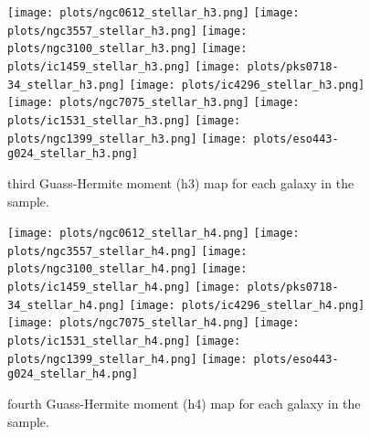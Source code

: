 \documentclass[fleqn,usenatbib,useAMS]{mnras}
\begin{document}
        \begin{figure*}
            \centering
            \texttt{[image: plots/ngc0612\_stellar\_h3.png]}
            \texttt{[image: plots/ngc3557\_stellar\_h3.png]}
            \texttt{[image: plots/ngc3100\_stellar\_h3.png]}
            \texttt{[image: plots/ic1459\_stellar\_h3.png]}
            \texttt{[image: plots/pks0718-34\_stellar\_h3.png]}
            \texttt{[image: plots/ic4296\_stellar\_h3.png]}
            \texttt{[image: plots/ngc7075\_stellar\_h3.png]}
            \texttt{[image: plots/ic1531\_stellar\_h3.png]}
            \texttt{[image: plots/ngc1399\_stellar\_h3.png]}
            \texttt{[image: plots/eso443-g024\_stellar\_h3.png]}
            \caption{ third Guass-Hermite moment (h3) map for each galaxy in the sample.}
            \label{fig:stellar_h3}
        \end{figure*}


        \begin{figure*}
            \centering
            \texttt{[image: plots/ngc0612\_stellar\_h4.png]}
            \texttt{[image: plots/ngc3557\_stellar\_h4.png]}
            \texttt{[image: plots/ngc3100\_stellar\_h4.png]}
            \texttt{[image: plots/ic1459\_stellar\_h4.png]}
            \texttt{[image: plots/pks0718-34\_stellar\_h4.png]}
            \texttt{[image: plots/ic4296\_stellar\_h4.png]}
            \texttt{[image: plots/ngc7075\_stellar\_h4.png]}
            \texttt{[image: plots/ic1531\_stellar\_h4.png]}
            \texttt{[image: plots/ngc1399\_stellar\_h4.png]}
            \texttt{[image: plots/eso443-g024\_stellar\_h4.png]}
            \caption{ fourth Guass-Hermite moment (h4) map for each galaxy in the sample.}
            \label{fig:stellar_h4}
        \end{figure*}
\end{document}
